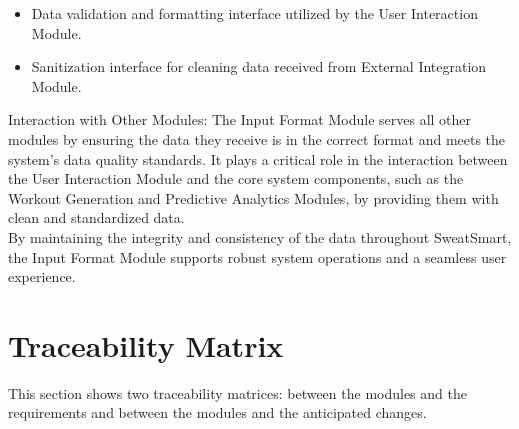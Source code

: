 \documentclass[12pt, titlepage]{article}
\begin{document}
\begin{description}[leftmargin=0pt]
\item[Interfaces:]
\end{description}
\begin{itemize}[leftmargin=*]
\item Data validation and formatting interface utilized by the User Interaction Module.
\item Sanitization interface for cleaning data received from External Integration Module.
\end{itemize}

Interaction with Other Modules: The Input Format Module serves all other modules by ensuring the data they receive is in the correct format and meets the system's data quality standards. It plays a critical role in the interaction between the User Interaction Module and the core system components, such as the Workout Generation and Predictive Analytics Modules, by providing them with clean and standardized data.
\\

By maintaining the integrity and consistency of the data throughout SweatSmart, the Input Format Module supports robust system operations and a seamless user experience.


\setlength{\parindent}{default}

\section{Traceability Matrix} \label{SecTM}

This section shows two traceability matrices: between the modules and the
requirements and between the modules and the anticipated changes.
\end{document}

